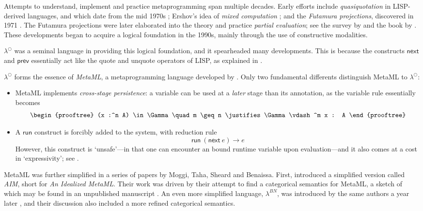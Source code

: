 \documentclass[a4paper]{amsart}
\begin{document}
Attempts to understand, implement and practice metaprogramming
span multiple decades. Early efforts include \emph{quasiquotation}
in LISP-derived languages, and which date from the mid 1970s
\citep{Bawden1999}; Ershov's idea of \emph{mixed computation}
\citep{Ershov1982}; and the \emph{Futamura projections},
discovered in 1971 \citep{Futamura1999}. The Futamura projections
were later elaborated into the theory and practice \emph{partial
evaluation}; see the survey by \cite{Jones1996} and the book by
\cite{Jones1993}. These developments began to acquire a logical
foundation in the 1990s, mainly through the use of constructive
modalities.

$\lambda^\bigcirc$ was a seminal language in providing this
logical foundation, and it spearheaded many developments. This is
because the constructs $\textsf{next}$ and $\textsf{prev}$
essentially act like the quote and unquote operators of LISP, as
explained in \cite{Bawden1999}.

$\lambda^\bigcirc$ forms the essence of \emph{MetaML}, a
metaprogramming language developed by
\cite{Taha1997, Taha2000}.  Only two fundamental differents
distinguish MetaML to $\lambda^\bigcirc$: \begin{itemize}
  \item MetaML implements \emph{cross-stage persistence}: a
  variable can be used at a \emph{later} stage than its
  annotation, as the variable rule essentially becomes \[
    \begin{prooftree}
      (x :^n A) \in \Gamma
        \quad
      m \geq n
        \justifies
      \Gamma \vdash^m x : A
    \end{prooftree}
  \]

  \item A $\textsf{run}$ construct is forcibly added to the
  system, with reduction rule \[
    \textsf{run}\ (\textsf{next}\ e) \rightarrow e
  \] However, this construct is `unsafe'---in that one can encounter an
  bound runtime variable upon evaluation---and it also comes at a
  cost in `expressivity'; see \cite[\S 12]{Taha2000}.
\end{itemize} MetaML was further simplified in a series of papers
by Moggi, Taha, Sheard and Benaissa.  First, \cite{Moggi1999}
introduced a simplified version called \emph{AIM}, short for
\emph{An Idealized MetaML}. Their work was driven by their attempt
to find a categorical semantics for MetaML, a sketch of which may
be found in an unpublished manuscript \citep{Benaissa1998a}. An
even more simplified language, $\lambda^{BN}$, was introduced by
the same authors a year later \citep{Benaissa1999}, and their
discussion also included a more refined categorical semantics.
\end{document}

